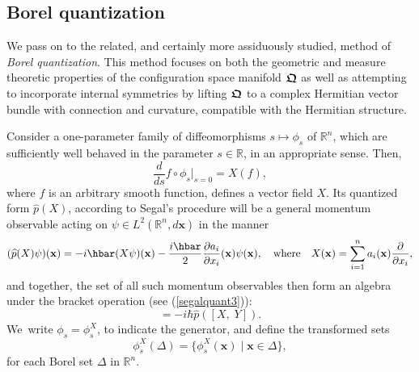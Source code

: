 \documentclass[12pt]{amsart}
\numberwithin{equation}{section}
\theoremstyle{remark}
\newcommand{\be}{\begin{equation}}
\newcommand{\en}{\end{equation}}
\newcommand{\bfrakQ}{\mbox{\boldmath $\mathfrak Q$}}
\newcommand{\bx}{\mathbf x}
\begin{document}
\subsection{Borel quantization}\label{sec-synborquant}

We pass on to the related, and certainly more assiduously studied, method of
{\em Borel quantization}. This method focuses on both the geometric and measure
theoretic properties of the configuration space manifold $\bfrakQ$ as well as
attempting to incorporate internal symmetries by lifting $\bfrakQ$ to a complex
Hermitian vector bundle with connection and curvature, compatible with the
Hermitian structure.

Consider a one-parameter family of diffeomorphisms $s \mapsto \phi_{s}$ of
${\mathbb R}^n$, which are sufficiently well behaved in the parameter
$s \in \mathbb R$, in an appropriate sense. Then,
\be
   \frac d{ds} f\circ \phi_{s}\vert_{s=0} = X(f),
\label{diffeomorph8}
\en
where $f$ is an arbitrary smooth function, defines a vector field $X$.
Its quantized form $\widehat{p}(X)$, according to Segal's procedure will be a
general momentum observable acting on $\psi \in  L^{2}({\mathbb R}^n, d\bx )$
in the manner
\be
    (\widehat{p}(X)\psi )(\bx ) = -i\hbar (X\psi )(\bx ) -
      \frac {i\hbar}{2}\frac {\partial a_i}{\partial x_i}(\bx ) \psi (\bx ),
      \quad \mbox{\rm where} \quad X(\bx ) =
      \sum_{i=1}^{n}a_i(\bx ) \frac {\partial}{\partial x_i},
\label{genmomobs1}
\en
and together, the set of all such momentum observables
then form an algebra under the bracket
operation (see (\ref{segalquant3})):
\be
   [\widehat{p}(X), \; \widehat{p}(Y)] = -i\hbar \widehat{p}([X, \;Y]).
\label{genmomobs2}
\en
We~write $\phi_{s} = \phi_{s}^{X}$, to indicate the generator, and define the
transformed sets
\be
   \phi_{s}^{X}(\Delta ) = \{\phi_{s}^{X}(\bx ) \;\vert\; \bx \in \Delta\},
\label{transfset1}
\en
for each Borel set $\Delta$ in ${\mathbb R}^n$.
\end{document}
